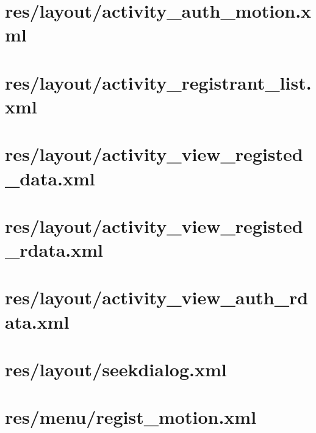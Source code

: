 \documentclass[11pt]{jreport}
\renewcommand{\slash}{/}
\begin{document}
    \section{res\slash layout\slash activity\_auth\_motion.xml}
    

    \section{res\slash layout\slash activity\_registrant\_list.xml}
    

    \section{res\slash layout\slash activity\_view\_registed\_data.xml}
    

    \section{res\slash layout\slash activity\_view\_registed\_rdata.xml}
    

    \section{res\slash layout\slash activity\_view\_auth\_rdata.xml}
    

    \section{res\slash layout\slash seekdialog.xml}
    

    \section{res\slash menu\slash regist\_motion.xml}
    
\end{document}
